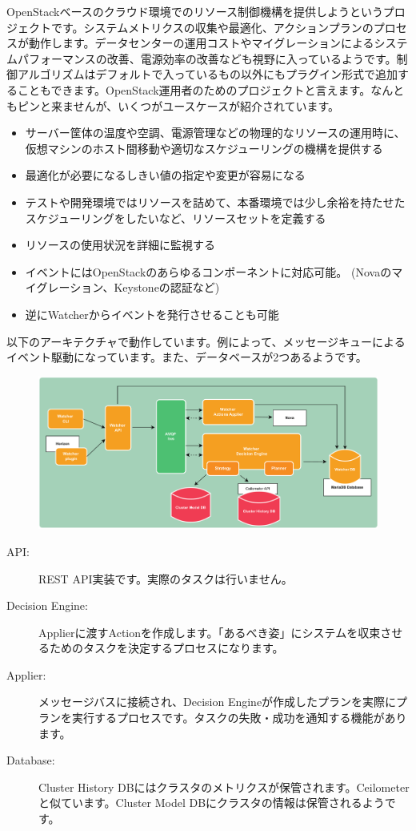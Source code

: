 OpenStackベースのクラウド環境でのリソース制御機構を提供しようというプロジェクトです。システムメトリクスの収集や最適化、アクションプランのプロセスが動作します。データセンターの運用コストやマイグレーションによるシステムパフォーマンスの改善、電源効率の改善なども視野に入っているようです。制御アルゴリズムはデフォルトで入っているもの以外にもプラグイン形式で追加することもできます。OpenStack運用者のためのプロジェクトと言えます。なんともピンと来ませんが、いくつがユースケースが紹介されています。

\begin{itemize}
	\item サーバー筐体の温度や空調、電源管理などの物理的なリソースの運用時に、仮想マシンのホスト間移動や適切なスケジューリングの機構を提供する
	\item 最適化が必要になるしきい値の指定や変更が容易になる
	\item テストや開発環境ではリソースを詰めて、本番環境では少し余裕を持たせたスケジューリングをしたいなど、リソースセットを定義する
	\item リソースの使用状況を詳細に監視する
	\item イベントにはOpenStackのあらゆるコンポーネントに対応可能。 (Novaのマイグレーション、Keystoneの認証など)
	\item 逆にWatcherからイベントを発行させることも可能
\end{itemize}

以下のアーキテクチャで動作しています。例によって、メッセージキューによるイベント駆動になっています。また、データベースが2つあるようです。

\begin{figure}[htb]
	\begin{center}
		\includegraphics[width=\textwidth]{img/watcher-architecture.pdf}
	\end{center}
\end{figure}

\begin{description}
	\item[API:] REST API実装です。実際のタスクは行いません。
	\item[Decision Engine:] Applierに渡すActionを作成します。「あるべき姿」にシステムを収束させるためのタスクを決定するプロセスになります。
	\item[Applier:] メッセージバスに接続され、Decision Engineが作成したプランを実際にプランを実行するプロセスです。タスクの失敗・成功を通知する機能があります。
	\item[Database:] Cluster History DBにはクラスタのメトリクスが保管されます。Ceilometerと似ています。Cluster Model DBにクラスタの情報は保管されるようです。
\end{description}
